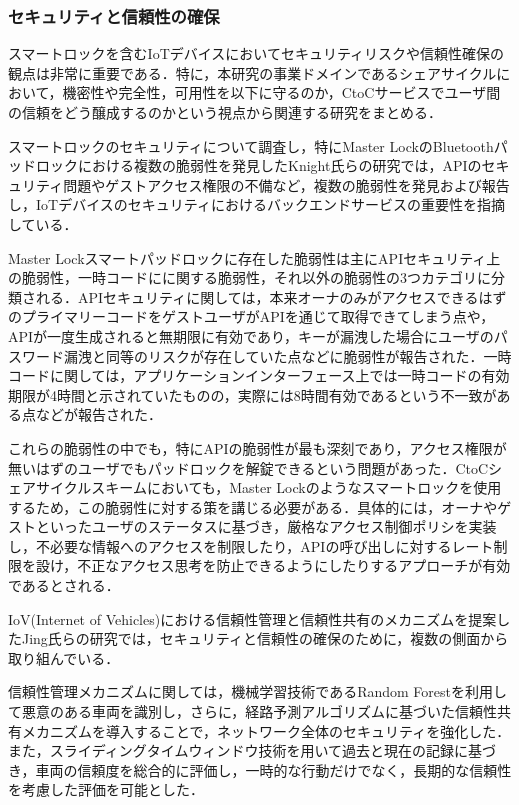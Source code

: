       \subsubsection{セキュリティと信頼性の確保}
        \label{sec:セキュリティと信頼性の確保}
          \par スマートロックを含むIoTデバイスにおいてセキュリティリスクや信頼性確保の観点は非常に重要である．特に，本研究の事業ドメインであるシェアサイクルにおいて，機密性や完全性，可用性を以下に守るのか，CtoCサービスでユーザ間の信頼をどう醸成するのかという視点から関連する研究をまとめる．
          \par スマートロックのセキュリティについて調査し，特にMaster LockのBluetoothパッドロックにおける複数の脆弱性を発見したKnight氏らの研究では，APIのセキュリティ問題やゲストアクセス権限の不備など，複数の脆弱性を発見および報告し，IoTデバイスのセキュリティにおけるバックエンドサービスの重要性を指摘している．
          \par Master Lockスマートパッドロックに存在した脆弱性は主にAPIセキュリティ上の脆弱性，一時コードにに関する脆弱性，それ以外の脆弱性の3つカテゴリに分類される．APIセキュリティに関しては，本来オーナのみがアクセスできるはずのプライマリーコードをゲストユーザがAPIを通じて取得できてしまう点や，APIが一度生成されると無期限に有効であり，キーが漏洩した場合にユーザのパスワード漏洩と同等のリスクが存在していた点などに脆弱性が報告された．一時コードに関しては，アプリケーションインターフェース上では一時コードの有効期限が4時間と示されていたものの，実際には8時間有効であるという不一致がある点などが報告された．
          \par これらの脆弱性の中でも，特にAPIの脆弱性が最も深刻であり，アクセス権限が無いはずのユーザでもパッドロックを解錠できるという問題があった．CtoCシェアサイクルスキームにおいても，Master Lockのようなスマートロックを使用するため，この脆弱性に対する策を講じる必要がある．具体的には，オーナやゲストといったユーザのステータスに基づき，厳格なアクセス制御ポリシを実装し，不必要な情報へのアクセスを制限したり，APIの呼び出しに対するレート制限を設け，不正なアクセス思考を防止できるようにしたりするアプローチが有効であるとされる．
          \par IoV(Internet of Vehicles)における信頼性管理と信頼性共有のメカニズムを提案したJing氏らの研究では，セキュリティと信頼性の確保のために，複数の側面から取り組んでいる．
          \par 信頼性管理メカニズムに関しては，機械学習技術であるRandom Forestを利用して悪意のある車両を識別し，さらに，経路予測アルゴリズムに基づいた信頼性共有メカニズムを導入することで，ネットワーク全体のセキュリティを強化した．また，スライディングタイムウィンドウ技術を用いて過去と現在の記録に基づき，車両の信頼度を総合的に評価し，一時的な行動だけでなく，長期的な信頼性を考慮した評価を可能とした．
